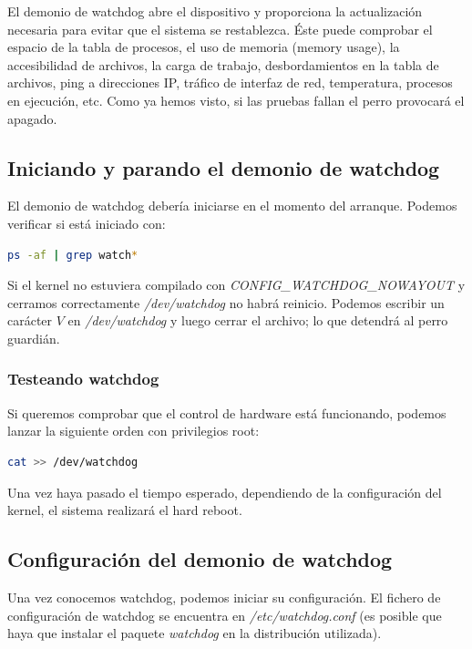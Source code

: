 \documentclass[a4paper, 11pt, titlepage]{book}
\begin{document}
        El demonio de watchdog abre el dispositivo y proporciona la actualización 
        necesaria para evitar que el sistema se restablezca. Éste puede comprobar 
        el espacio de la tabla de procesos, el uso de memoria (memory usage), la 
        accesibilidad de archivos, la carga de trabajo, desbordamientos en la tabla de 
        archivos, ping a direcciones IP, tráfico de interfaz de red, temperatura, 
        procesos en ejecución, etc. Como ya hemos visto, si las pruebas fallan 
        el perro provocará el apagado.

    \subsection{Iniciando y parando el demonio de watchdog}

        El demonio de watchdog debería iniciarse en el momento del arranque. 
        Podemos verificar si está iniciado con:

        \begin{lstlisting}[language=bash]
    ps -af | grep watch*\end{lstlisting}

        Si el kernel no estuviera compilado con \textit{CONFIG\_WATCHDOG\_NOWAYOUT}
        y cerramos correctamente \textit{/dev/watchdog} no habrá reinicio. Podemos 
        escribir un carácter $V$ en \textit{/dev/watchdog} y luego cerrar el archivo;
        lo que detendrá al perro guardián.

        \subsubsection{Testeando watchdog} Si queremos comprobar que el control de 
        hardware está funcionando, podemos lanzar la siguiente orden con privilegios 
        root:

        \begin{lstlisting}[language=bash]
    cat >> /dev/watchdog\end{lstlisting}

        Una vez haya pasado el tiempo esperado, dependiendo de la configuración 
        del kernel, el sistema realizará el hard reboot.

    \subsection{Configuración del demonio de watchdog}

        Una vez conocemos watchdog, podemos iniciar su configuración. El fichero de 
        configuración de watchdog se encuentra en \textit{/etc/watchdog.conf} 
        (es posible que haya que instalar el paquete \textit{watchdog} en la distribución 
        utilizada).
\end{document}
